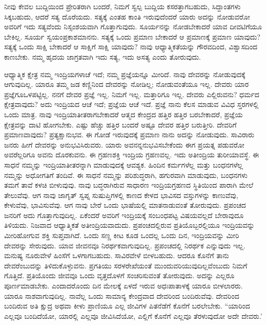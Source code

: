 ನೀವು ಕೇವಲ ಬುದ್ದಿಯಿಂದ ಪ್ರೇರಿತರಾಗಿ ಬಂದರೆ, ನಿಮಗೆ ಸ್ವಲ್ಪ ಬುದ್ದಿಯ ಕಸರತ್ತಾಗಬಹುದು, ಸಿದ್ದಾಂತಗಳು ಸಿಕ್ಕಬಹುದು, ಆದರೆ ಸತ್ಯ ದೊರೆಯದು. ಸತ್ಯಕ್ಕೆ ಎಂತಹ ಕಾಂತಿ ಇರುವುದೆಂದರೆ ಯಾರು ಅದನ್ನು ನೋಡುವರೋ ಅವರಿಗೆ ಇದು ಸತ್ಯವೆಂದು ನಿಸ್ಸಂಶಯವಾಗಿ ಗೊತ್ತಾಗುವುದು. ಸೂರ್ಯನನ್ನು ನೋಡಬೇಕಾದರೆ ಯಾವ ದೀವಟಿಗೆಯೂ ಬೇಕಿಲ್ಲ. ಸೂರ್ಯ ಸ್ವಯಂಪ್ರಕಾಶಮಾನನು. ಸತ್ಯಕ್ಕೆ ಒಂದು ಪ್ರಮಾಣ ಬೇಕಾದರೆ ಆ ಪ್ರಮಾಣಕ್ಕೆ ಪ್ರಮಾಣ ಯಾವುದು? ಸತ್ಯಕ್ಕೆ ಒಂದು ಸಾಕ್ಷಿ ಬೇಕಾದರೆ ಆ ಸಾಕ್ಷಿಗೆ ಸಾಕ್ಷಿ ಯಾವುದು? ನಾವು ಆಧ್ಯಾತ್ಮಿಕತೆಯನ್ನು ಗೌರವದಿಂದ, ವಿಶ್ವಾಸದಿಂದ ಕಾಣಬೇಕು. ನಮ್ಮ ಹೃದಯ ಜಾಗ್ರತವಾಗಿ ಇದು ಸತ್ಯ, ಇದು ಅಸತ್ಯ ಎಂದು ತೋರುವುದು.

ಆಧ್ಯಾತ್ಮಿಕ ಕ್ಷೇತ್ರ ನಮ್ಮ ಇಂದ್ರಿಯಗಳಾಚೆ ಇದೆ; ನಮ್ಮ ಪ್ರಜ್ಞೆಯನ್ನೂ ಮೀರಿದೆ. ನಾವು ದೇವರನ್ನು ನೋಡುವುದಕ್ಕೆ ಆಗುವುದಿಲ್ಲ. ಯಾರೂ ತಮ್ಮ ಜಡ ಕಣ್ಣಿನಿಂದ ದೇವರನ್ನು ನೋಡಿಲ್ಲ; ನೋಡುವಂತೆಯೂ ಇಲ್ಲ. ದೇವರು ಯಾರ ಪ್ರಜ್ಞೆಗೂ\break ಒಳಪಟ್ಟಿಲ್ಲ. ನನಗೆ ದೇವರ ಪ್ರಜ್ಞೆ ಇಲ್ಲ. ನಿಮಗೆ ಇಲ್ಲ. ಮತ್ತಾರಿಗೂ ಇಲ್ಲ. ದೇವರು ಎಲ್ಲಿರುವನು? ಧರ್ಮದ ಕ್ಷೇತ್ರವಾವುದು? ಅದು ಇಂದ್ರಿಯದ ಆಚೆ ಇದೆ; ಪ್ರಜ್ಞೆಯ ಆಚೆ ಇದೆ. ಪ್ರಜ್ಞೆ ನಾನು ಕೆಲಸ ಮಾಡುವ ವಿವಿಧ ಸ್ತರಗಳಲ್ಲಿ ಒಂದು ಮಾತ್ರ. ನಾವು ಇಂದ್ರಿಯಾತೀತರಾಗಬೇಕಾದರೆ ಆತ್ಮದ ಕೇಂದ್ರದ ಹತ್ತಿರ ಹತ್ತಿರ ಬರಬೇಕಾದರೆ, ಪ್ರಜ್ಞೆಯ ಕ್ಷೇತ್ರವನ್ನು ದಾಟಿ ಹೋಗಬೇಕು. ಎಷ್ಟು ಹೆಚ್ಚು ಹತ್ತಿರ ಬಂದರೆ ಅಷ್ಟೂ ದೇವರ ಹತ್ತಿರ ಬರುತ್ತೀರಿ. ದೇವರಿಗೆ ಪ್ರಮಾಣವಾವುದು? ಪ್ರತ್ಯಕ್ಷಾನುಭವ. ಈ ಗೋಡೆ ಇರುವುದಕ್ಕೆ ಪ್ರಮಾಣ ನಾನು ಅದನ್ನು ನೋಡುವುದು. ಸಾವಿರಾರು ಜನರು ಹೀಗೆ ದೇವರನ್ನು ಅನುಭವಿಸಿರುವರು. ಯಾರು ಅವನನ್ನನುಭವಿಸಬೇಕೆಂದು ಈಗ ಪ್ರಯತ್ನ ಪಡುವರೋ ಅವರೆಲ್ಲರಿಗೂ ಅವನು ದೊರಕುವನು. ಈ ಗ್ರಹಣಶಕ್ತಿ ಇಂದ್ರಿಯ ಗ್ರಹಣವಲ್ಲ. ಇದು ಅತೀಂದ್ರಿಯ ತುರೀಯಾವಸ್ಥೆ. ಈ ಸಾಧನೆ ನಮ್ಮನ್ನು ಇಂದ್ರಿಯಾತೀತರನ್ನಾಗಿ ಮಾಡುವುದಕ್ಕೆ ಆವಶ್ಯಕ. ಹಿಂದಿನ ಕರ್ಮಗಳೆಲ್ಲ ಮತ್ತು ಬಂಧನಗಳೆಲ್ಲ ನಮ್ಮನ್ನು ಅಧೋಗತಿಗೆ ತಂದಿವೆ. ಈ ಸಾಧನೆ ನಮ್ಮನ್ನು ಪರಿಶುದ್ಧರಾಗಿ, ಹಗುರವಾಗಿ ಮಾಡುವುದು, ಬಂಧನಗಳು ತಮಗೆ ತಾವೆ ಕಳಚಿ ಬೀಳುವುವು. ನಾವು ಬದ್ಧರಾಗಿರುವ ಸಾಧಾರಣ ಇಂದ್ರಿಯಗ್ರಹಣದ ಸ್ಥಿತಿಯಿಂದ ಪಾರಾಗಿ ಮೇಲೆ ತೇಲುವೆವು. ಆಗ ನಾವು ಜಾಗೃತ್ ಸ್ವಪ್ನ ಸುಷುಪ್ತಿಗಳಲ್ಲಿ ಕಾಣದ ಕೇಳದ ಭಾವಿಸದ ವಸ್ತುಗಳನ್ನು ಕಾಣುವೆವು, ಕೇಳುವೆವು, ಭಾವಿಸುವೆವು. ಆಗ ನಾವು ಬೇರೆ ಒಂದು ಭಾಷೆಯಲ್ಲಿ ಮಾತನಾಡುವಂತೆ ತೋರುವುದು. ಪ್ರಪಂಚದ ಜನರಿಗೆ ಅದು ಗೊತ್ತಾಗುವುದಿಲ್ಲ. ಏಕೆಂದರೆ ಅವರಿಗೆ ಇಂದ್ರಿಯಕ್ಕೆ ಸಂಬಂಧಪಟ್ಟ ವಿಷಯವಲ್ಲದೆ ಬೇರಾವುದೂ ತಿಳಿಯದು. ನಿಜವಾದ ಆಧ್ಯಾತ್ಮಿಕತೆ ಅತೀಂದ್ರಿಯವಾದುದು. ಪ್ರಪಂಚದಲ್ಲಿರುವ ಪ್ರತಿಯೊಬ್ಬರಲ್ಲಿಯೂ ಇಂದ್ರಿಯವನ್ನು ಮೀರಿಹೋಗುವ ಶಕ್ತಿ ಸುಪ್ತವಾಗಿದೆ. ಒಂದು ಸಣ್ಣ ಕೀಟ ಕೂಡ ಒಂದಲ್ಲ ಒಂದು ದಿನ, ಇಂದ್ರಿಯವನ್ನು ಮೀರಿ ದೇವರನ್ನು ಸೇರುವುದು. ಯಾವ ಜೀವನವೂ ನಿರರ್ಥಕವಾಗುವುದಿಲ್ಲ. ಪ್ರಪಂಚದಲ್ಲಿ ನಿರರ್ಥಕ ಎನ್ನುವುದು ಇಲ್ಲ. ಮನುಷ್ಯ ನೂರುವೇಳೆ ಹಿಂಸೆಗೆ ಒಳಗಾಗಬಹುದು. ಸಾವಿರವೇಳೆ ಬೀಳಬಹುದು. ಆದರೂ ಕೊನೆಗೆ ತಾನು ದೇವರೆಂಬುದನ್ನು ತಿಳಿದುಕೊಳ್ಳುವನು. ಪ್ರಗತಿಯು ಸರಳರೇಖೆಯಂತೆ ಮುಂದುವರಿಯುವುದಿಲ್ಲವೆಂಬುದು ನಿಮಗೆ ಗೊತ್ತಿದೆ. ಪ್ರತಿಯೊಂದು ಜೀವವೂ ಒಂದು ವೃತ್ತದೊಳಗೆ ಸಂಚರಿಸುವಂತೆ ತೋರುವುದು. ಅದನ್ನು ಎಲ್ಲರೂ ಪೂರ್ಣಮಾಡಬೇಕು. ಎಂದಾದರೊಂದು ದಿನ ಮೇಲಕ್ಕೆ ಏಳದೆ ಇರುವ ಅಧಃಪಾತಾಳಕ್ಕೆ ಯಾರೂ ಬೀಳಲಾರರು. ಯಾರೂ ನಾಶವಾಗುವುದಿಲ್ಲ. ನಾವೆಲ್ಲ ಒಂದು ಸಾಮಾನ್ಯ ಕೇಂದ್ರವಾದ ದೇವರಿಂದ ಬಂದಿರುವೆವು. ದೇವರಿಂದ ಬಂದಿರುವ ಅತಿ ಕ್ಷುದ್ರ ಅಥವಾ ಕೀಳು ಪ್ರಾಣಿಯೂ ಎಲ್ಲ ಜೀವಿಗಳ ಪಿತನೆಡೆಗೆ ಕೊನೆಗೆ ಬರಲೇಬೇಕು. “ಯಾರಿಂದ ಎಲ್ಲವೂ ಬಂದಿದೆಯೋ, ಯಾರಲ್ಲಿ ಎಲ್ಲವೂ ಜೀವಿಸಿದೆಯೋ, ಎಲ್ಲಿಗೆ ಕೊನೆಗೆ ಎಲ್ಲವೂ ತೆರಳುವುದೋ ಅದೇ ದೇವರು.'

